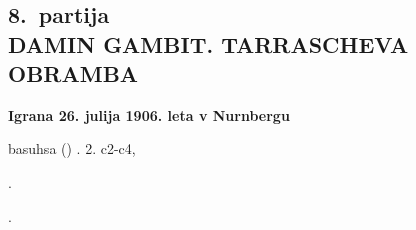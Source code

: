 \documentclass[11pt,a4paper]{book}
\begin{document}
\pagestyle{headings}

\styleC

\chapter*{}

\section*{8.\ partija\\
DAMIN GAMBIT. TARRASCHEVA OBRAMBA}
{\tiny\bf Igrana 26. julija 1906. leta v Nurnbergu}

\newgame\longmoves
{}
%

basuhsa 
()
 .  2.  c2-c4, 

.

.
\end{document}
